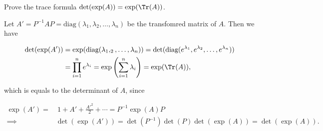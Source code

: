 \documentclass[a4paper,12pt]{report}
\begin{document}
{Prove the trace formula \(\det (\exp (A)) = \exp (\Tr (A)) \).}
{Let \(A' = P^{-1} AP = \text{diag} (\lambda _{1}, \lambda _{2}, \ldots , \lambda _{n}   )\) be the transfomred matrix of \(A\). Then we have

\begin{equation}
    \begin{aligned} 
    \det (\exp (A')) &= \exp (\text{diag} (\lambda _{1}, _{2}, \ldots ,\lambda _{n}   )) = \det (\text{diag} (e^{\lambda _{1} }, e^{\lambda _{2} },\ldots , e^{\lambda _{n} }   )) \\ &= \prod_{i=1}^{n} e^{\lambda _{i} } = \exp \left( \sum_{i=1}^{n} \lambda _{i}  \right) = \exp (\Tr (A)),
    \end{aligned} 
\end{equation}

which is equals to the determinant of \(A\), since


\begin{equation}
    \begin{aligned} 
    \exp (A') = &~1+A'+\frac{A'^2}{2} + \cdots = P^{-1} \exp (A) P \\
    \implies &\det (\exp (A')) = \det (P^{-1} ) \det (P) \det (\exp (A)) = \det (\exp (A)).
    \end{aligned} 
\end{equation}~
} 
\end{document}
